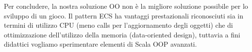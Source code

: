 Per concludere, la nostra soluzione OO non è la migliore soluzione possibile per lo sviluppo di un gioco. Il pattern ECS ha vantaggi prestazionali riconosciuti sia in termini di utilizzo CPU (meno calls per l'aggiornamento degli oggetti) che di ottimizzazione dell'utilizzo della memoria (data-oriented design), tuttavia a fini didattici vogliamo sperimentare elementi di Scala OOP avanzati.
